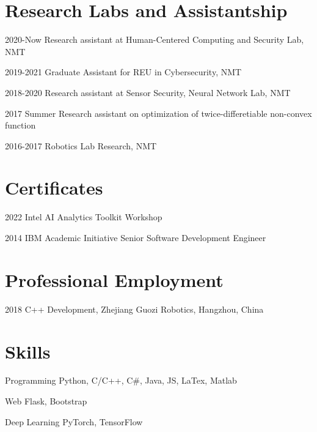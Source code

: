 \documentclass[12pt,letterpaper]{report}
\begin{document}
    \section*{Research Labs and Assistantship}
    \begin{tablist}
        \item[2020-Now] \tab{}Research assistant at Human-Centered Computing and Security Lab, NMT
        \item[2019-2021] \tab{}Graduate Assistant for REU in Cybersecurity, NMT
        \item[2018-2020] \tab{}Research assistant at Sensor Security, Neural Network Lab, NMT
        \item[2017 Summer] \tab{}Research assistant on optimization of twice-differetiable non-convex function
        \item[2016-2017] \tab{}Robotics Lab Research, NMT
    \end{tablist}

    \section*{Certificates}
    \begin{tablist}
        \item[2022] \tab{}Intel AI Analytics Toolkit Workshop
        \item[2014] \tab{}IBM Academic Initiative Senior Software Development Engineer
    \end{tablist}

    \section*{Professional Employment}
    \begin{tablist}
        \item[2018] \tab{}C++ Development, Zhejiang Guozi Robotics, Hangzhou, China
    \end{tablist}

    \section*{Skills}
    \begin{tablist}
        \item[Programming] \tab{}Python, C/C++, C\#, Java, JS, LaTex, Matlab
        \item[Web] \tab{}\tab{}Flask, Bootstrap
        \item[Deep Learning] \tab{}PyTorch, TensorFlow
    \end{tablist}
\end{document}
